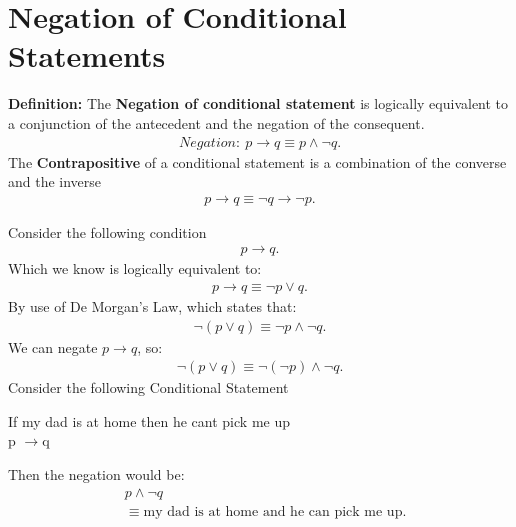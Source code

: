 \documentclass{report}
\begin{document}
    \section{Negation of Conditional Statements}
    \bigbreak \noindent 
    \begin{mdframed}
        \textbf{Definition:}
       The \textbf{Negation of conditional statement} is logically equivalent to a conjunction of the antecedent and the negation of the consequent.
       \begin{align*}
           Negation:\ p \rightarrow q \equiv p \land \neg q 
       .\end{align*}
       \bigbreak \noindent 
       The \textbf{Contrapositive} of a conditional statement is a combination of the converse and the inverse
       \begin{align*}
           p \rightarrow q \equiv \neg q \rightarrow \neg p
       .\end{align*}


    \end{mdframed}
    \bigbreak \noindent 
    Consider the following condition
    \begin{align*}
       p \rightarrow q 
    .\end{align*}
    \bigbreak \noindent 
    Which we know is logically equivalent to:
    \begin{align*}
        p \rightarrow q \equiv \neg p \lor q
    .\end{align*}
    \bigbreak \noindent 
    By use of De Morgan's Law, which states that:
    \begin{align*}
        \neg(p\lor q) \equiv \neg p \land \neg q
    .\end{align*}
    \bigbreak \noindent 
    We can negate $p \rightarrow q$, so:
    \begin{align*}
        \neg(p \lor q) \equiv \neg(\neg p) \land \neg q
    .\end{align*}
    \bigbreak \noindent 
    Consider the following Conditional Statement
    \begin{center}
        If my dad is at home then he cant pick me up \\
        p $\rightarrow$q
    \end{center}
    \bigbreak \noindent 
    Then the negation would be:
    \begin{align*}
        &p \land \neg q \\
        &\equiv \text{my dad is at home and he can pick me up}
    .\end{align*}
\end{document}

